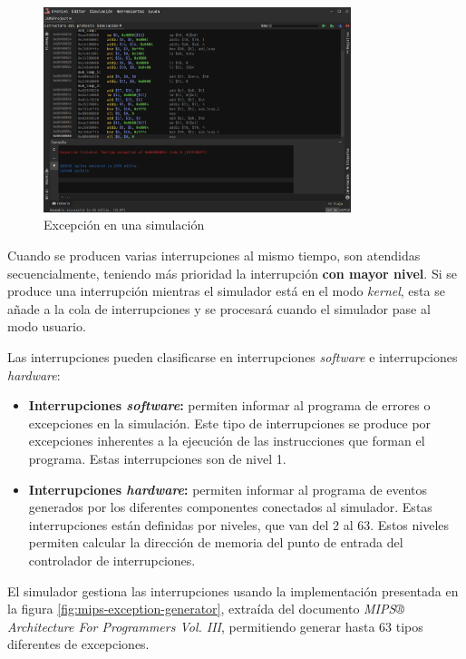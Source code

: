 \begin{figure}[h]
    \centering
    \includegraphics[width=0.8\textwidth]{images/mips/jams-exception}
    \caption{Excepción en una simulación}
    \label{fig:jams-exception}
\end{figure}

Cuando se producen varias interrupciones al mismo tiempo,
son atendidas secuencialmente, teniendo más prioridad
la interrupción \textbf{con mayor nivel}.
Si se produce una interrupción mientras el simulador está en el
modo \textit{kernel}, esta se añade a la cola de interrupciones
y se procesará cuando el simulador pase al modo usuario.

Las interrupciones pueden clasificarse en interrupciones
\textit{software} e interrupciones \textit{hardware}:
\begin{itemize}
    \item \textbf{Interrupciones \textit{software}:} permiten informar
    al programa de errores o excepciones en la simulación.
    Este tipo de interrupciones se produce por excepciones
    inherentes a la ejecución de las instrucciones que forman el programa.
    Estas interrupciones son de nivel 1.
    \item \textbf{Interrupciones \textit{hardware}:} permiten informar
    al programa de eventos generados por los diferentes componentes
    conectados al simulador.
    Estas interrupciones están definidas por
    niveles, que van del 2 al 63.
    Estos niveles permiten calcular la dirección de memoria
    del punto de entrada del controlador de interrupciones.
\end{itemize}

El simulador gestiona las interrupciones usando la
implementación presentada en la figura \ref{fig:mips-exception-generator},
extraída del documento
\textit{MIPS® Architecture For Programmers Vol. III}\cite{MIPS_VOL_3},
permitiendo generar hasta 63 tipos diferentes de excepciones.


